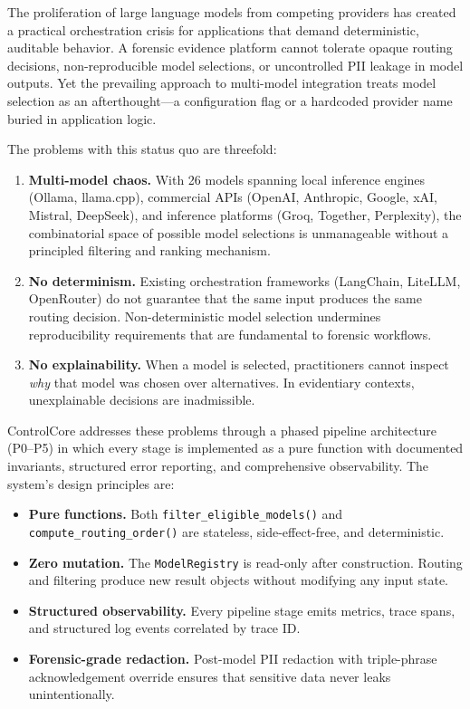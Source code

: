 \documentclass[11pt,a4paper]{article}
\theoremstyle{plain}
\theoremstyle{definition}
\begin{document}
The proliferation of large language models from competing providers has created a
practical orchestration crisis for applications that demand deterministic,
auditable behavior. A forensic evidence platform cannot tolerate opaque routing
decisions, non-reproducible model selections, or uncontrolled PII leakage in
model outputs. Yet the prevailing approach to multi-model integration treats
model selection as an afterthought---a configuration flag or a hardcoded
provider name buried in application logic.

The problems with this status quo are threefold:

\begin{enumerate}[leftmargin=2em]
\item \textbf{Multi-model chaos.} With 26 models spanning local inference
      engines (Ollama, llama.cpp), commercial APIs (OpenAI, Anthropic, Google,
      xAI, Mistral, DeepSeek), and inference platforms (Groq, Together,
      Perplexity), the combinatorial space of possible model selections is
      unmanageable without a principled filtering and ranking mechanism.

\item \textbf{No determinism.} Existing orchestration frameworks (LangChain,
      LiteLLM, OpenRouter) do not guarantee that the same input produces the
      same routing decision. Non-deterministic model selection undermines
      reproducibility requirements that are fundamental to forensic workflows.

\item \textbf{No explainability.} When a model is selected, practitioners cannot
      inspect \emph{why} that model was chosen over alternatives. In evidentiary
      contexts, unexplainable decisions are inadmissible.
\end{enumerate}

ControlCore addresses these problems through a phased pipeline architecture
(P0--P5) in which every stage is implemented as a pure function with documented
invariants, structured error reporting, and comprehensive observability. The
system's design principles are:

\begin{itemize}[leftmargin=2em]
\item \textbf{Pure functions.} Both \texttt{filter\_eligible\_models()} and
      \texttt{compute\_routing\_order()} are stateless, side-effect-free, and
      deterministic.
\item \textbf{Zero mutation.} The \texttt{ModelRegistry} is read-only after
      construction. Routing and filtering produce new result objects without
      modifying any input state.
\item \textbf{Structured observability.} Every pipeline stage emits metrics,
      trace spans, and structured log events correlated by trace ID.
\item \textbf{Forensic-grade redaction.} Post-model PII redaction with
      triple-phrase acknowledgement override ensures that sensitive data never
      leaks unintentionally.
\end{itemize}
\end{document}
